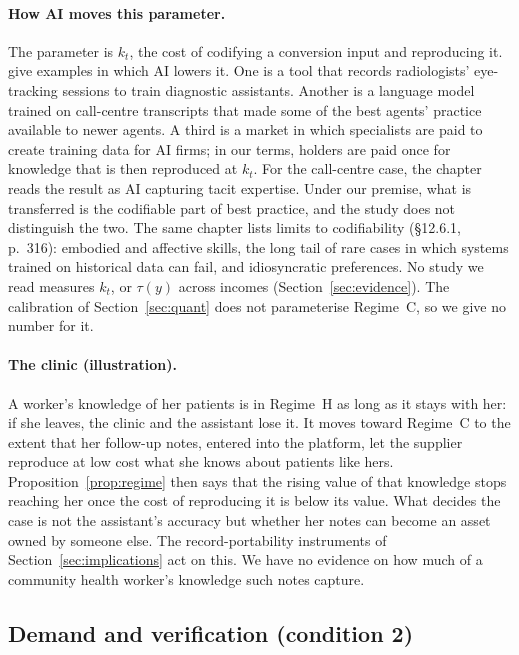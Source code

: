 \documentclass[12pt]{article}
\theoremstyle{remark}
\begin{document}
\paragraph{How AI moves this parameter.} The parameter is $k_t$, the cost of codifying a conversion input and reproducing it. \citet[\S12.4.2, p.~310]{brynjolfsson2026hayek} give examples in which AI lowers it. One is a tool that records radiologists' eye-tracking sessions to train diagnostic assistants. Another is a language model trained on call-centre transcripts that made some of the best agents' practice available to newer agents. A third is a market in which specialists are paid to create training data for AI firms; in our terms, holders are paid once for knowledge that is then reproduced at $k_t$. For the call-centre case, the chapter reads the result as AI capturing tacit expertise. Under our premise, what is transferred is the codifiable part of best practice, and the study \citep{brynjolfsson2025work} does not distinguish the two. The same chapter lists limits to codifiability (\S12.6.1, p.~316): embodied and affective skills, the long tail of rare cases in which systems trained on historical data can fail, and idiosyncratic preferences. No study we read measures $k_t$, or $\tau(y)$ across incomes (Section~\ref{sec:evidence}). The calibration of Section~\ref{sec:quant} does not parameterise Regime~C, so we give no number for it.

\paragraph{The clinic (illustration).} A worker's knowledge of her patients is in Regime~H as long as it stays with her: if she leaves, the clinic and the assistant lose it. It moves toward Regime~C to the extent that her follow-up notes, entered into the platform, let the supplier reproduce at low cost what she knows about patients like hers. Proposition~\ref{prop:regime} then says that the rising value of that knowledge stops reaching her once the cost of reproducing it is below its value. What decides the case is not the assistant's accuracy but whether her notes can become an asset owned by someone else. The record-portability instruments of Section~\ref{sec:implications} act on this. We have no evidence on how much of a community health worker's knowledge such notes capture.

\subsection{Demand and verification (condition 2)}\label{sec:verification}
\end{document}
